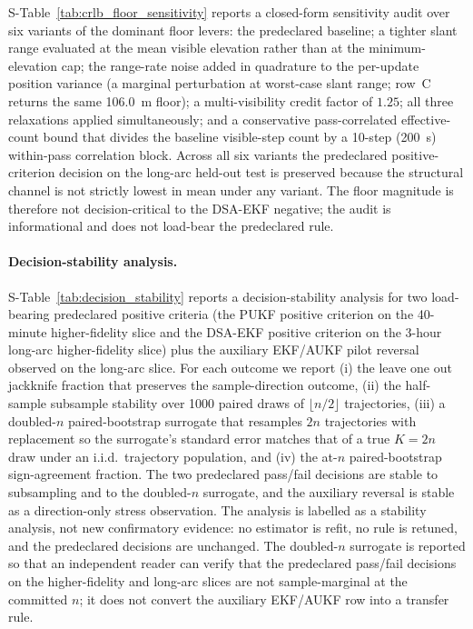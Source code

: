 \documentclass{article}
\begin{document}
S-Table~\ref{tab:crlb_floor_sensitivity} reports a closed-form sensitivity audit over six variants of the dominant floor levers: the predeclared baseline; a tighter slant range evaluated at the mean visible elevation rather than at the minimum-elevation cap; the range-rate noise added in quadrature to the per-update position variance (a marginal perturbation at worst-case slant range; row~C returns the same 106.0~m floor); a multi-visibility credit factor of $1.25$; all three relaxations applied simultaneously; and a conservative pass-correlated effective-count bound that divides the baseline visible-step count by a 10-step (200~s) within-pass correlation block. Across all six variants the predeclared positive-criterion decision on the long-arc held-out test is preserved because the structural channel is not strictly lowest in mean under any variant. The floor magnitude is therefore not decision-critical to the DSA-EKF negative; the audit is informational and does not load-bear the predeclared rule.



\paragraph{Decision-stability analysis.}
S-Table~\ref{tab:decision_stability} reports a decision-stability analysis for two load-bearing predeclared positive criteria (the PUKF positive criterion on the 40-minute higher-fidelity slice and the DSA-EKF positive criterion on the 3-hour long-arc higher-fidelity slice) plus the auxiliary EKF/AUKF pilot reversal observed on the long-arc slice. For each outcome we report (i) the leave one out jackknife fraction that preserves the sample-direction outcome, (ii) the half-sample subsample stability over 1000 paired draws of $\lfloor n/2\rfloor$ trajectories, (iii) a doubled-$n$ paired-bootstrap surrogate that resamples $2n$ trajectories with replacement so the surrogate's standard error matches that of a true $K{=}2n$ draw under an i.i.d.\ trajectory population, and (iv) the at-$n$ paired-bootstrap sign-agreement fraction. The two predeclared pass/fail decisions are stable to subsampling and to the doubled-$n$ surrogate, and the auxiliary reversal is stable as a direction-only stress observation. The analysis is labelled as a stability analysis, not new confirmatory evidence: no estimator is refit, no rule is retuned, and the predeclared decisions are unchanged. The doubled-$n$ surrogate is reported so that an independent reader can verify that the predeclared pass/fail decisions on the higher-fidelity and long-arc slices are not sample-marginal at the committed $n$; it does not convert the auxiliary EKF/AUKF row into a transfer rule.
\end{document}
